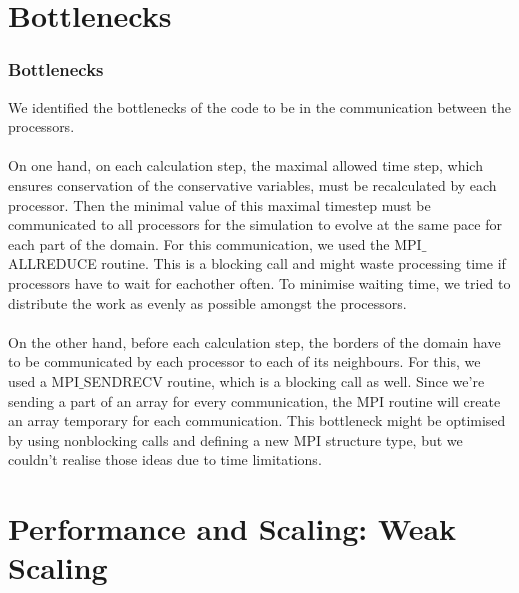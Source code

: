 \documentclass[8pt]{beamer}
\begin{document}
\section{Bottlenecks}
\begin{frame}
	\frametitle{Bottlenecks}
	We identified the bottlenecks of the code to be in the communication between the processors.\\~\\
	
	On one hand, on each calculation step, the maximal allowed time step, which ensures conservation of the conservative variables, must be recalculated by each processor. Then the minimal value of this maximal timestep must be communicated to all processors for the simulation to evolve at the same pace for each part of the domain. For this communication, we used the MPI$\_$ALLREDUCE routine. This is a blocking call and might waste processing time if processors have to wait for eachother often. To minimise waiting time, we tried to distribute the work as evenly as possible amongst the processors.\\~\\
	
	On the other hand, before each calculation step, the borders of the domain have to be communicated by each processor to each of its neighbours. For this, we used a MPI$\_$SENDRECV routine, which is a blocking call as well. Since we're sending a part of an array for every communication, the MPI routine will create an array temporary for each communication. This bottleneck might be optimised by using nonblocking calls and defining a new MPI structure type, but we couldn't realise those ideas due to time limitations.
\end{frame}




\section{Performance and Scaling: Weak Scaling}
\end{document}
